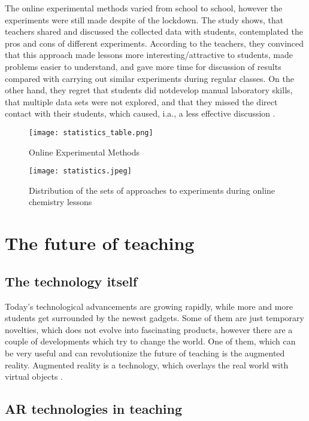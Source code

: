 \documentclass[10pt,oneside,english,a4paper]{article}
\begin{document}
	The online experimental methods varied from school to school, however the experiments were still made despite of the lockdown. The study shows, that teachers shared and discussed the collected data with students, contemplated the pros and cons of different experiments. According to the teachers, they convinced that this approach made lessons more interesting/attractive to students, made problems easier to understand, and gave more time for discussion of results  compared with carrying out similar experiments during regular classes. On the other hand, they regret that students did notdevelop manual laboratory skills, that multiple data sets were not explored, and that they missed the direct contact with their students, which caused, i.a., a less effective discussion \cite{Babinkov2020}.

\begin{figure*}[tbh]
\centering
\texttt{[image: statistics\_table.png]}
\caption{Online Experimental Methods\cite{Babinkov2020}}
\label{f:rozhod}
\end{figure*}

\begin{figure*}[tbh!]
\centering
\texttt{[image: statistics.jpeg]}
\caption{Distribution of the sets of approaches to experiments during online chemistry lessons\cite{Babinkov2020}}
\label{f:rozhod}
\end{figure*}


\section{The future of teaching}\label{future}

\subsection{The technology itself}

	Today's technological advancements are growing rapidly, while more and more students get surrounded by the newest gadgets. Some of them are just temporary novelties, which does not evolve into fascinating products, however there are a couple of developments which try to change the world. One of them, which can be very useful and can revolutionize the future of teaching is the augmented reality. Augmented reality is a technology, which overlays the real world with virtual objects \cite{Tretyakova2019}.

\subsection{AR technologies in teaching}
\end{document}
